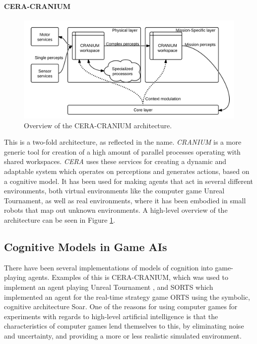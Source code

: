 \paragraph{CERA-CRANIUM}
\begin{figure}[h!tb]
\centering
\includegraphics[width=\textwidth]{graphics/ceracranium.png}
\caption{Overview of the CERA-CRANIUM architecture.}
\label{fig:cera-cranium}
\end{figure}
This is a two-fold architecture, as reflected in the name. {\em CRANIUM} is a more generic tool for creation of a high amount of parallel processes operating with shared workspaces. {\em CERA} uses these services for creating a dynamic and adaptable system which operates on perceptions and generates actions, based on a cognitive model.\cite{arrabales2009gamechars} It has been used for making agents that act in several different environments, both virtual environments like the computer game Unreal Tournament, as well as real environments, where it has been embodied in small robots that map out unknown environments. \cite{arrabales2009ceracranium} A high-level overview of the architecture can be seen in Figure \ref{fig:cera-cranium}.

\subsection{Cognitive Models in Game AIs}
There have been several implementations of models of cognition into game-playing agents. Examples of this is CERA-CRANIUM, which was used to implement an agent playing Unreal Tournament \cite{arrabales2009ceracranium}, and SORTS which implemented an agent for the real-time strategy game ORTS using the symbolic, cognitive architecture Soar.\cite{wintermute2007sorts} One of the reasons for using computer games for experiments with regards to high-level artificial intelligence is that the characteristics of computer games lend themselves to this, by eliminating noise and uncertainty, and providing a more or less realistic simulated environment.
